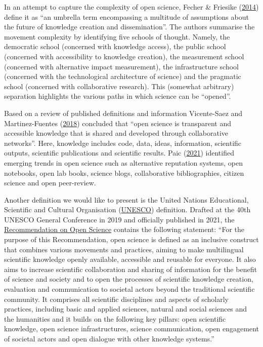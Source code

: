 \documentclass[
]{book}
\begin{document}
In an attempt to capture the complexity of open science, Fecher \& Friesike (\href{https://www.researchgate.net/publication/236607487_Open_Science_One_Term_Five_Schools_of_Thought}{2014}) define it as ``an umbrella term encompassing a multitude of assumptions about the future of knowledge creation and dissemination''. The authors summarise the movement complexity by identifying five schools of thought. Namely, the democratic school (concerned with knowledge access), the public school (concerned with accessibility to knowledge creation), the measurement school (concerned with alternative impact measurement), the infrastructure school (concerned with the technological architecture of science) and the pragmatic school (concerned with collaborative research). This (somewhat arbitrary) separation highlights the various paths in which science can be ``opened''.

Based on a review of published definitions and information Vicente-Saez and Martinez-Fuentes (\href{https://isiarticles.com/bundles/Article/pre/pdf/143111.pdf}{2018}) concluded that ``open science is transparent and accessible knowledge that is shared and developed through collaborative networks''. Here, knowledge includes code, data, ideas, information, scientific outputs, scientific publications and scientific results. Paic (\href{https://goingdigital.oecd.org/data/notes/No13_ToolkitNote_OpenScience.pdf}{2021}) identified emerging trends in open science such as alternative reputation systems, open notebooks, open lab books, science blogs, collaborative bibliographies, citizen science and open peer-review.

Another definition we would like to present is the United Nations Educational, Scientific and Cultural Organisation (\href{https://www.unesco.org/en}{UNESCO}) definition. Drafted at the 40th UNESCO General Conference in 2019 and officially published in 2021, the \href{https://en.unesco.org/science-sustainable-future/open-science/recommendation}{Recommendation on Open Science} contains the following statement: ``For the purpose of this Recommendation, open science is defined as an inclusive construct that combines various movements and practices, aiming to make multilingual scientific knowledge openly available, accessible and reusable for everyone. It also aims to increase scientific collaboration and sharing of information for the benefit of science and society and to open the processes of scientific knowledge creation, evaluation and communication to societal actors beyond the traditional scientific community. It comprises all scientific disciplines and aspects of scholarly practices, including basic and applied sciences, natural and social sciences and the humanities and it builds on the following key pillars: open scientific knowledge, open science infrastructures, science communication, open engagement of societal actors and open dialogue with other knowledge systems.''
\end{document}
